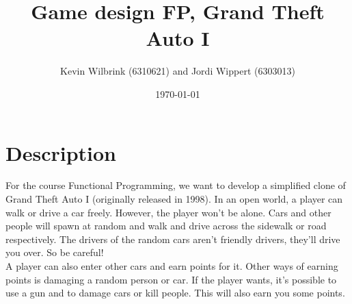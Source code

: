 \documentclass[12pt]{article}
\title{\textbf{Game design FP, Grand Theft Auto I}}
\date{\today}
\author{Kevin Wilbrink (6310621) and Jordi Wippert (6303013)}
\begin{document}
	\maketitle

	\section{Description}
	For the course Functional Programming, we want to develop a simplified clone of Grand Theft Auto I (originally released in 1998). In an open world, a player can walk or drive a car freely. However, the player won't be alone. Cars and other people will spawn at random and walk and drive across the sidewalk or road respectively. The drivers of the random cars aren't friendly drivers, they'll drive you over. So be careful!\\
	A player can also enter other cars and earn points for it. Other ways of earning points is damaging a random person or car. If the player wants, it's possible to use a gun and to damage cars or kill people. This will also earn you some points.
\end{document}
